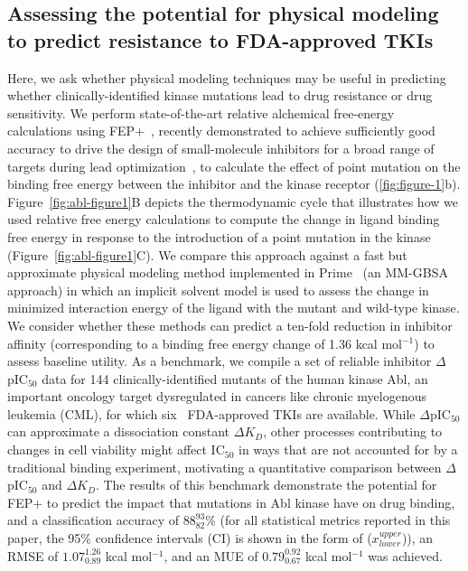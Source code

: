 \documentclass[phd,tocprelim]{cornell}
\renewcommand{\FIG}[1]{\autoref{fig:#1}}
\begin{document}
\subsection{Assessing the potential for physical modeling to predict resistance to FDA-approved TKIs}
Here, we ask whether physical modeling techniques may be useful in predicting whether clinically-identified kinase mutations lead to drug resistance or drug sensitivity.
We perform state-of-the-art relative alchemical free-energy calculations using FEP+~\citep{Wang:J.Am.Chem.Soc.:2015}, recently demonstrated to achieve sufficiently good accuracy to drive the design of small-molecule inhibitors for a broad range of targets during lead optimization~\citep{Lovering:ChemMedChem:2016,Chodera:Curr.Opin.Struct.Biol.:2011,Wang:J.Am.Chem.Soc.:2015,abel2017accelerating}, to calculate the effect of point mutation on the binding free energy between the inhibitor and the kinase receptor (\FIG{figure-1}b).
Figure~\ref{fig:abl-figure1}B depicts the thermodynamic cycle that illustrates how we used relative free energy calculations to compute the change in ligand binding free energy in response to the introduction of a point mutation in the kinase (Figure~\ref{fig:abl-figure1}C).
We compare this approach against a fast but approximate physical modeling method implemented in Prime~\citep{Rapp:J.Chem.Inf.Model.:2011} (an MM-GBSA approach) in which an implicit solvent model is used to assess the change in minimized interaction energy of the ligand with the mutant and wild-type kinase.
We consider whether these methods can predict a ten-fold reduction in inhibitor affinity (corresponding to a binding free energy change of 1.36 kcal mol$^{-1}$) to assess baseline utility.
As a benchmark, we compile a set of reliable inhibitor $\Delta$pIC$_{50}$ data for 144 clinically-identified mutants of the human kinase Abl, an important oncology target dysregulated in cancers like chronic myelogenous leukemia (CML), for which six~\citep{fda-approved-kinase-inhibitors} FDA-approved TKIs are available.
While $\Delta$pIC$_{50}$ can approximate a dissociation constant $\Delta K_{D}$, other processes contributing to changes in cell viability might affect IC$_{50}$ in ways that are not accounted for by a traditional binding experiment, motivating a quantitative comparison between $\Delta$pIC$_{50}$ and $\Delta K_{D}$.
The results of this benchmark demonstrate the potential for FEP+ to predict the impact that mutations in Abl kinase have on drug binding, and a classification accuracy of $88_{82}^{93}$\%  (for all statistical metrics reported in this paper, the 95\% confidence intervals (CI) is shown in the form of ($x^{upper}_{lower}$)), an RMSE of $1.07_{0.89}^{1.26}$ kcal mol$^{-1}$, and an MUE of $0.79_{0.67}^{0.92}$ kcal mol$^{-1}$ was achieved. 
\end{document}
